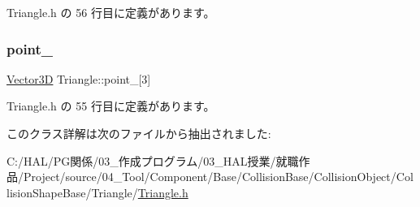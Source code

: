  Triangle.\+h の 56 行目に定義があります。

\mbox{\label{class_triangle_ab25f2be0ff148b58f1db904ad050353e}} 
\subsubsection{\texorpdfstring{point\+\_\+}{point\_}}
{\footnotesize\ttfamily \mbox{\hyperlink{class_vector3_d}{Vector3D}} Triangle\+::point\+\_\+\mbox{[}3\mbox{]}}



 Triangle.\+h の 55 行目に定義があります。



このクラス詳解は次のファイルから抽出されました\+:\begin{DoxyCompactItemize}
\item 
C\+:/\+H\+A\+L/\+P\+G関係/03\+\_\+作成プログラム/03\+\_\+\+H\+A\+L授業/就職作品/\+Project/source/04\+\_\+\+Tool/\+Component/\+Base/\+Collision\+Base/\+Collision\+Object/\+Collision\+Shape\+Base/\+Triangle/\mbox{\hyperlink{_triangle_8h}{Triangle.\+h}}\end{DoxyCompactItemize}

